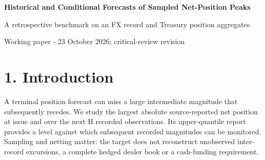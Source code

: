 \documentclass[10pt,a4paper]{article}
\begin{document}
\fontsize{10.5}{14}\selectfont
\begin{center}
{\LARGE\bfseries Historical and Conditional Forecasts of Sampled Net-Position Peaks}\par\vspace{8pt}
{\large A retrospective benchmark on an FX record and Treasury position aggregates}\par\vspace{6pt}
Working paper - 23 October 2026; critical-review revision
\end{center}
\begin{abstract}
We benchmark established forecasts of the 0.95 quantile of the largest absolute net position observed at issue and over the next H source records. Historical constructions are evaluated against ridge quantile regression (QR) and local quantiles using completed responses and matched-history controls. The FX evaluation archive had previously been inspected; the Treasury exercise replays a downloaded vintage by economic date rather than historical public release. On 6,625 FX origins, the declared six-record-horizon QR primary lowers mean pinball loss by 12.66\% against its original rolling reference and 14.77\% against a matched-history reference, with 376 breaches versus 332 and 360. On 277 weekly Treasury-aggregate origins, the separately fitted six-week QR primary raises loss by 50.79\% and breaches from 28 to 54. Exploratory AR replay improves on matched increment translation in five of eight cells while breaches increase in all eight. Reweighting eight archived .95 reports distinguishes the FX short-horizon reductions in both mean error components from the small 24-record gain, which reverses above an underprediction/overprediction weight ratio of 20.63, near the stipulated 19. These retrospective comparisons establish source-, horizon-, history- and family-dependent rankings, without coverage guarantees or observed trading and funding benefits.
\end{abstract}
\section*{1. Introduction}
A terminal position forecast can miss a large intermediate magnitude that subsequently recedes. We study the largest absolute source-reported net position at issue and over the next H recorded observations. Its upper-quantile report provides a level against which subsequent recorded magnitudes can be monitored. Sampling and netting matter: the target does not reconstruct unobserved inter-record excursions, a complete hedged dealer book or a cash-funding requirement.
\end{document}
